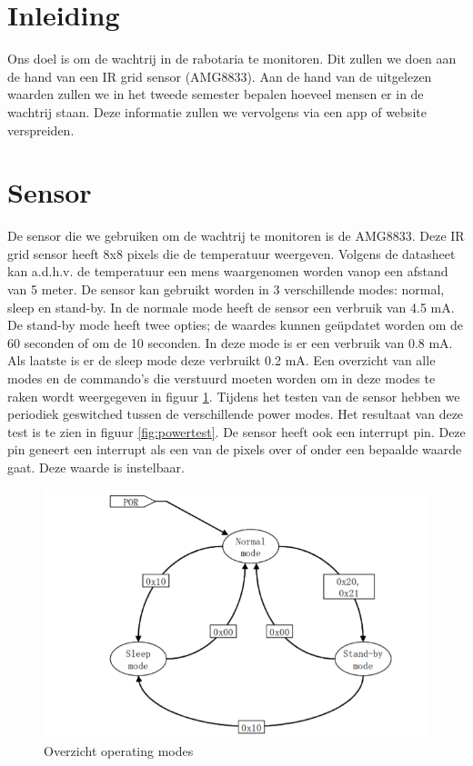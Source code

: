 \documentclass[]{article}
\title{}
\author{Thomas Feys \and Jona Cappelle}
\begin{document}
\maketitle

\tableofcontents


\section{Inleiding}
Ons doel is om de wachtrij in de rabotaria te monitoren. Dit zullen we doen aan de hand van een IR grid sensor (AMG8833). Aan de hand van de uitgelezen waarden zullen we in het tweede semester bepalen hoeveel mensen er in de wachtrij staan. Deze informatie zullen we vervolgens via een app of website verspreiden. 
\section{Sensor}
De sensor die we gebruiken om de wachtrij te monitoren is de AMG8833. Deze IR grid sensor heeft 8x8 pixels die de temperatuur weergeven. Volgens de datasheet kan a.d.h.v. de temperatuur een mens waargenomen worden vanop een afstand van 5 meter. De sensor kan gebruikt worden in 3 verschillende modes: normal, sleep en stand-by. In de normale mode heeft de sensor een verbruik van 4.5 mA. De stand-by mode heeft twee opties; de waardes kunnen geüpdatet worden om de 60 seconden of om de 10 seconden. In deze mode is er een verbruik van 0.8 mA. Als laatste is er de sleep mode deze verbruikt 0.2 mA. Een overzicht van alle modes en de commando's die verstuurd moeten worden om in deze modes te raken wordt weergegeven in figuur \ref{fig:operatingmodes}. Tijdens het testen van de sensor hebben we periodiek geswitched tussen de verschillende power modes. Het resultaat van deze test is te zien in figuur \ref{fig:powertest}. De sensor heeft ook een interrupt pin. Deze pin geneert een interrupt als een van de pixels over of onder een bepaalde waarde gaat. Deze waarde is instelbaar.	
\begin{figure}[!ht]
	\centering
	\includegraphics{operatingmodes.png}
	\caption{Overzicht operating modes}
	\label{fig:operatingmodes}
\end{figure}
\end{document}
